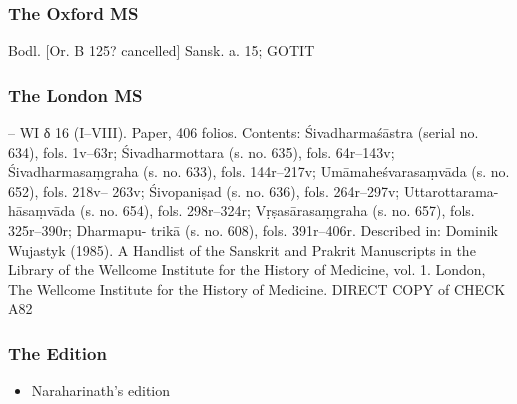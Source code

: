 \documentclass[11pt]{article}
\begin{document}
\subsubsection{The Oxford MS}
\label{sec:orgc0b038c}
Bodl. [Or. B 125? cancelled] Sansk. a. 15; GOTIT

\subsubsection{The London MS}
\label{sec:org7cc2162}
-- WI δ 16 (I--VIII). Paper, 406 folios. Contents: Śivadharmaśāstra (serial no. 634), fols. 1v--63r; 
Śivadharmottara (s. no. 635), fols. 64r--143v; Śivadharmasaṃgraha (s. no. 633), fols. 144r--217v; 
Umāmaheśvarasaṃvāda (s. no. 652), fols. 218v-- 263v; Śivopaniṣad (s. no. 636), fols. 264r--297v; 
Uttarottarama-hāsaṃvāda (s. no.  654), fols. 298r--324r; Vṛṣasārasaṃgraha (s. no. 657), fols. 325r--390r; 
Dharmapu- trikā (s. no. 608), fols. 391r--406r. Described in: Dominik Wujastyk (1985). A Handlist of the 
Sanskrit and Prakrit Manuscripts in the Library of the Wellcome Institute for the History of Medicine, 
vol. 1. London, The Wellcome Institute for the History of Medicine.
DIRECT COPY of CHECK A82

\subsubsection{The Edition}
\label{sec:org96d4df5}
\begin{itemize}
\item \Ed Naraharinath's edition
\end{itemize}
\end{document}
